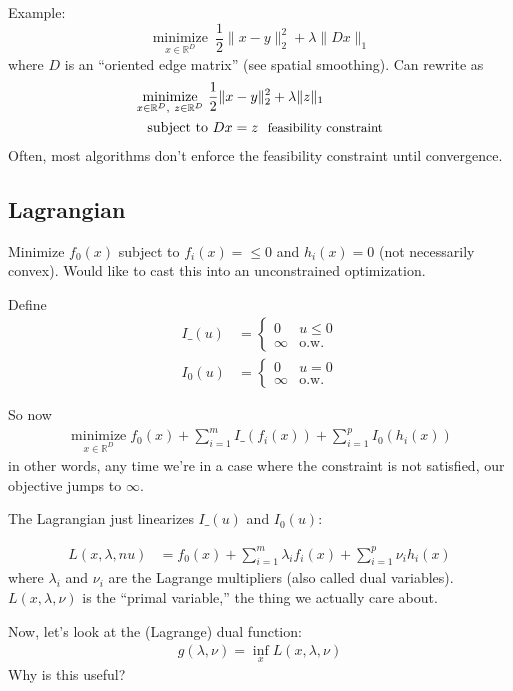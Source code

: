 \documentclass{article}
\begin{document}
Example: $$\underset{x\in \mathbb{R}^D}{\operatorname{minimize}}~\frac{1}{2}\lVert x-y\rVert_2^2 + \lambda \lVert Dx\rVert_1$$ where $D$ is an ``oriented edge matrix'' (see spatial smoothing). Can rewrite as
\begin{align*}
\underset{x\in \mathbb{R}^D,~z\in\mathbb{R}^D}{\operatorname{minimize}}~&\frac{1}{2}\lVert x-y\rVert_2^2 + \lambda \lVert z\rVert_1\\
\textrm{subject to}&~Dx=z~~{\small \textrm{feasibility constraint}}
\end{align*}
Often, most algorithms don't enforce the feasibility constraint until convergence.

\subsection{Lagrangian}
Minimize $f_0(x)$ subject to $f_i(x)=\leq 0$ and $h_i(x)=0$ (not necessarily convex). Would like to cast this into an unconstrained optimization.

Define \begin{align*}
I\_(u)&=\left\{\begin{array}{cc}0 & u\leq 0\\\infty & \textrm{o.w.}\end{array}\right.\\
I_0(u)&=\left\{\begin{array}{cc}0 & u= 0\\\infty & \textrm{o.w.}\end{array}\right.
\end{align*}

So now
\begin{align*}
\underset{x\in \mathbb{R}^D}{\operatorname{minimize}}
f_0(x)+\sum_{i=1}^m I\_(f_i(x)) + \sum_{i=1}^p I_0(h_i(x))
\end{align*}
in other words, any time we're in a case where the constraint is not satisfied, our objective jumps to $\infty$.

The Lagrangian just linearizes $I\_(u)$ and $I_0(u)$:

\begin{align*}
L(x, \lambda, nu)&=f_0(x) +\sum_{i=1}^m \lambda_if_i(x) + \sum_{i=1}^p \nu_ih_i(x)
\end{align*}
where $\lambda_i$ and $\nu_i$ are the Lagrange multipliers (also called dual variables). $L(x, \lambda, \nu)$ is the ``primal variable,'' the thing we actually care about.

Now, let's look at the (Lagrange) dual function:
\begin{align*}
g(\lambda, \nu)=\inf_x L(x, \lambda, \nu)
\end{align*}
Why is this useful?
\end{document}
